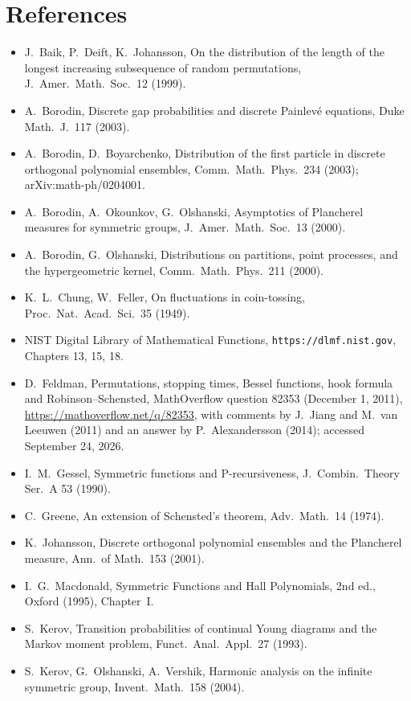 \documentclass[11pt]{article}
\theoremstyle{definition}
\theoremstyle{remark}
\begin{document}
\section*{References}
\begin{itemize}[leftmargin=1.5em]
\item J.~Baik, P.~Deift, K.~Johansson, On the distribution of the length of the longest increasing subsequence of random permutations, J.~Amer.\ Math.\ Soc.\ 12 (1999).
\item A.~Borodin, Discrete gap probabilities and discrete Painlev\'e equations, Duke Math.\ J.\ 117 (2003).
\item A.~Borodin, D.~Boyarchenko, Distribution of the first particle in discrete orthogonal polynomial ensembles, Comm.\ Math.\ Phys.\ 234 (2003); arXiv:math-ph/0204001.
\item A.~Borodin, A.~Okounkov, G.~Olshanski, Asymptotics of Plancherel measures for symmetric groups, J.~Amer.\ Math.\ Soc.\ 13 (2000).
\item A.~Borodin, G.~Olshanski, Distributions on partitions, point processes, and the hypergeometric kernel, Comm.\ Math.\ Phys.\ 211 (2000).
\item K.~L.~Chung, W.~Feller, On fluctuations in coin-tossing, Proc.\ Nat.\ Acad.\ Sci.\ 35 (1949).
\item NIST Digital Library of Mathematical Functions, \texttt{https://dlmf.nist.gov}, Chapters 13, 15, 18.
\item D.~Feldman, Permutations, stopping times, Bessel functions, hook formula and Robinson--Schensted, MathOverflow question 82353 (December 1, 2011), \url{https://mathoverflow.net/q/82353}, with comments by J.~Jiang and M.~van Leeuwen (2011) and an answer by P.~Alexandersson (2014); accessed September 24, 2026.
\item I.~M.~Gessel, Symmetric functions and P-recursiveness, J.~Combin.\ Theory Ser.\ A 53 (1990).
\item C.~Greene, An extension of Schensted's theorem, Adv.\ Math.\ 14 (1974).
\item K.~Johansson, Discrete orthogonal polynomial ensembles and the Plancherel measure, Ann.\ of Math.\ 153 (2001).
\item I.~G.~Macdonald, Symmetric Functions and Hall Polynomials, 2nd ed., Oxford (1995), Chapter~I.
\item S.~Kerov, Transition probabilities of continual Young diagrams and the Markov moment problem, Funct.\ Anal.\ Appl.\ 27 (1993).
\item S.~Kerov, G.~Olshanski, A.~Vershik, Harmonic analysis on the infinite symmetric group, Invent.\ Math.\ 158 (2004).

\end{itemize}
\end{document}
